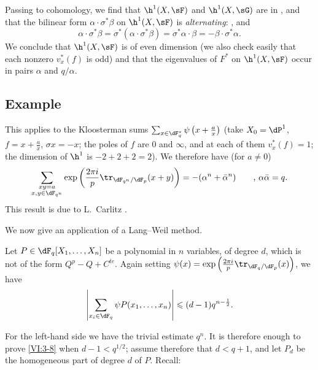 Passing to cohomology, we find that $\h^1(X,\sF)$ and $\h^1(X,\sG)$ are in 
, and that the bilinear form 
$\alpha\cdot \sigma^\ast\beta$ on $\h^1(X,\sF)$ is \emph{alternating}: 
, and 
\[
  \alpha\cdot \sigma^\ast \beta = \sigma^\ast(\alpha\cdot \sigma^\ast \beta) = \sigma^\ast \alpha\cdot \beta = -\beta\cdot \sigma^\ast \alpha \text{.} 
\]
We conclude that $\h^1(X,\sF)$ is of even dimension (we also check 
    easily that each nonzero $v_x^\ast(f)$ is odd) and that the 
eigenvalues of $F^\ast$ on $\h^1(X,\sF)$ occur in pairs $\alpha$ and 
$q/\alpha$. 






\subsection{Example}\label{VI:3-7}

This applies to the Kloosterman sums 
$\sum_{x\in \dF_q^\ast} \psi\left(x+\frac a x\right)$ (take 
$X_0=\dP^1$, $f=x+\frac a x$, $\sigma x=-x$; the poles of $f$ are $0$ and 
$\infty$, and at each of them $v_x^\ast(f)=1$; the dimension of $\h^1$ is 
$-2+2+2=2$). We therefore have (for $a\ne 0$) 
\[
  \sum_{\substack{x y=a \\ x,y\in \dF_{q^n}}} \exp\left(\frac{2\pi i}{p} \tr_{\dF_{q^n}/\dF_p}(x+y)\right) = -(\alpha^n+\bar\alpha^n) \qquad \text{, }\alpha\bar \alpha = q \text{.} 
\]
This result is due to L.\ Carlitz . 

We now give an application of a Lang--Weil method. 





\begin{proposition_}\label{VI:3-8}
Let $P\in \dF_q[X_1,\dots,X_n]$ be a polynomial in $n$ variables, of degree 
$d$, which is not of the form $Q^p-Q+C^{te}$. Again setting 
$\psi(x) = \exp\left(\frac{2\pi i}{p} \tr_{\dF_q/\dF_p}(x)\right)$, we have 
\[
  \left|\sum_{x_i\in \dF_q} \psi P(x_1,\dots,x_n)\right| \leqslant (d-1) q^{n-\frac 1 2} \text{.}
\]
\end{proposition_}

For the left-hand side we have the trivial estimate $q^n$. It is therefore enough to 
prove \ref{VI:3-8} when $d-1<q^{1/2}$; assume therefore that 
$d<q+1$, and let $P_d$ be the homogeneous part of degree $d$ of $P$. Recall: 





